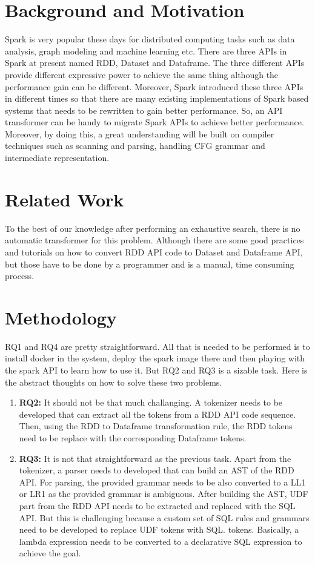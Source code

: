 \documentclass[sigplan, review]{acmart}\settopmatter{printfolios=true,printccs=false,printacmref=false}
\begin{document}
\section{Background and Motivation}
Spark is very popular these days for distributed computing tasks such as data analysis, graph modeling and machine learning etc. There are three APIs in Spark at present named RDD, Dataset and Dataframe. The three different APIs provide different expressive power to achieve the same thing although the performance gain can be different. Moreover, Spark introduced these three APIs in different times so that there are many existing implementations of Spark based systems that needs to be rewritten to gain better performance. So, an API transformer can be handy to migrate Spark APIs to achieve better performance. Moreover, by doing this, a great understanding will be built on compiler techniques such as scanning and parsing, handling CFG grammar and intermediate representation.  

\section{Related Work}
To the best of our knowledge after performing an exhaustive search, there is no automatic transformer for this problem. Although there are some good practices and tutorials on how to convert RDD API code to Dataset and Dataframe API, but those have to be done by a programmer and is a manual, time consuming process. 

\section{Methodology}
RQ1 and RQ4 are pretty straightforward. All that is needed to be performed is to install docker in the system, deploy the spark image there and then playing with the spark API to learn how to use it. But RQ2 and RQ3 is a sizable task. Here is the abstract thoughts on how to solve these two problems. 

\begin{enumerate}
	\item \textbf{RQ2:} It should not be that much challanging. A tokenizer needs to be developed that can extract all the tokens from a RDD API code sequence. Then, using the RDD to Dataframe transformation rule, the RDD tokens need to be replace with the corresponding Dataframe tokens.
	\item \textbf{RQ3:} It is not that straightforward as the previous task. Apart from the tokenizer, a parser needs to developed that can build an AST of the RDD API. For parsing, the provided grammar needs to be also converted to a LL1 or LR1 as the provided grammar is ambiguous. After building the AST, UDF part from the RDD API needs to be extracted and replaced with the SQL API. But this is challenging because a custom set of SQL rules and grammars need to be developed to replace UDF tokens with SQL. tokens. Basically, a lambda expression needs to be converted to a declarative SQL expression to achieve the goal. 
\end{enumerate}  
\end{document}
